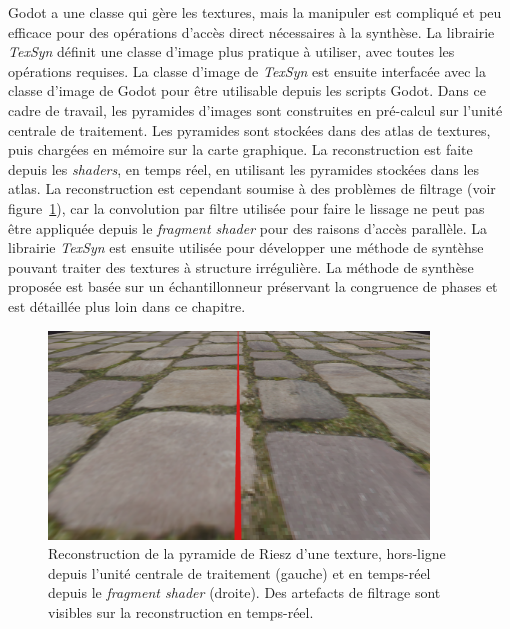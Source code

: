 \bigskip

Godot a une classe qui gère les textures, mais la manipuler est compliqué et peu efficace pour des opérations d'accès direct nécessaires à la synthèse. La librairie \textit{TexSyn} définit une classe d'image plus pratique à utiliser, avec toutes les opérations requises. La classe d'image de \textit{TexSyn} est ensuite interfacée avec la classe d'image de Godot pour être utilisable depuis les scripts Godot. Dans ce cadre de travail, les pyramides d'images sont construites en pré-calcul sur l'unité centrale de traitement. Les pyramides sont stockées dans des atlas de textures, puis chargées en mémoire sur la carte graphique. La reconstruction est faite depuis les \textit{shaders}, en temps réel, en utilisant les pyramides stockées dans les atlas. La reconstruction est cependant soumise à des problèmes de filtrage (voir figure~\ref{fig:texsyn-reconstruction}), car la convolution par filtre utilisée pour faire le lissage ne peut pas être appliquée depuis le \textit{fragment shader} pour des raisons d'accès parallèle. La librairie \textit{TexSyn} est ensuite utilisée pour développer une méthode de syntèhse pouvant traiter des textures à structure irrégulière. La méthode de synthèse proposée est basée sur un échantillonneur préservant la congruence de phases et est détaillée plus loin dans ce chapitre.

\begin{figure}
    \centering
    \includegraphics[width=0.9\textwidth]{contenu/resources/images/reconstruction_cpu_vs_gpu}
    \caption[Reconstruction de texture dans \textit{TexSyn}]{Reconstruction de la pyramide de Riesz d'une texture, hors-ligne depuis l'unité centrale de traitement (gauche) et en temps-réel depuis le \textit{fragment shader} (droite). Des artefacts de filtrage sont visibles sur la reconstruction en temps-réel.}
    \label{fig:texsyn-reconstruction}
\end{figure}


